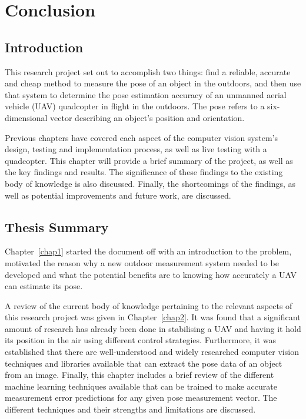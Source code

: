 \chapter{Conclusion}
\label{chap6}

\section{Introduction}

This research project set out to accomplish two things: find a reliable, accurate and cheap method to measure the pose of an object in the outdoors, and then use that system to determine the pose estimation accuracy of an unmanned aerial vehicle (UAV) quadcopter in flight in the outdoors. The pose refers to a six-dimensional vector describing an object's position and orientation. 

Previous chapters have covered each aspect of the computer vision system's design, testing and implementation process, as well as live testing with a quadcopter. This chapter will provide a brief summary of the project, as well as the key findings and results. The significance of these findings to the existing body of knowledge is also discussed. Finally, the shortcomings of the findings, as well as potential improvements and future work, are discussed. 

\section{Thesis Summary}

Chapter~\ref{chap1} started the document off with an introduction to the problem, motivated the reason why a new outdoor measurement system needed to be developed and what the potential benefits are to knowing how accurately a UAV can estimate its pose.  

A review of the current body of knowledge pertaining to the relevant aspects of this research project was given in Chapter~\ref{chap2}. It was found that a significant amount of research has already been done in stabilising a UAV and having it hold its position in the air using different control strategies. Furthermore, it was established that there are well-understood and widely researched computer vision techniques and libraries available that can extract the pose data of an object from an image. Finally, this chapter includes a brief review of the different machine learning techniques available that can be trained to make accurate measurement error predictions for any given pose measurement vector. The different techniques and their strengths and limitations are discussed.  

